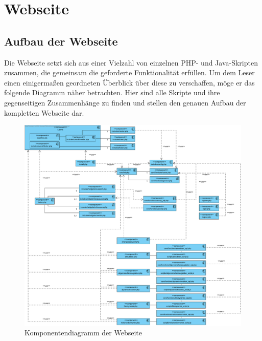\documentclass[fontsize = 12pt, paper = a4]{scrreprt}
\begin{document}
\section{Webseite}


\subsection{Aufbau der Webseite}
Die Webseite setzt sich aus einer Vielzahl von einzelnen PHP- und Java-Skripten zusammen, die gemeinsam die geforderte Funktionalität erfüllen. Um dem Leser einen einigermaßen geordneten Überblick über diese zu verschaffen, möge er das folgende Diagramm näher betrachten. Hier sind alle Skripte und ihre gegenseitigen Zusammenhänge zu finden und stellen den genauen Aufbau der kompletten Webseite dar.

\begin{figure}[h]
\centering
\includegraphics[scale = 0.4]{webseite}
\caption[Komponentendiagramm der Webseite]{Komponentendiagramm der Webseite}
\label{aufbau}
\end{figure}
\end{document}
